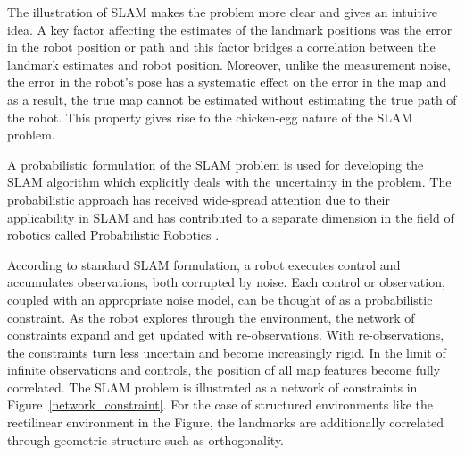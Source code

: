 The illustration of \acs{SLAM} makes the problem more clear and gives an intuitive idea. A key factor affecting the estimates of the landmark positions was the error in the robot position or path and this factor bridges a correlation between the landmark estimates and robot position. Moreover, unlike the measurement noise, the error in the robot's pose has a systematic effect on the error in the map and as a result, the true map cannot be estimated without estimating the true path of the robot. This property gives rise to the chicken-egg nature of the SLAM problem. 

A probabilistic formulation of the SLAM problem is used for developing the SLAM algorithm which explicitly deals with the uncertainty in the problem. The probabilistic approach has received wide-spread attention due to their applicability in SLAM and has contributed to a separate dimension in the field of robotics called Probabilistic Robotics \cite{thrun2005probabilistic}. 

According to standard SLAM formulation, a robot executes control and accumulates observations, both corrupted by noise. Each control or observation, coupled with an appropriate noise model, can be thought of as a probabilistic constraint. As the robot explores through the environment, the network of constraints expand and get updated with re-observations. With re-observations, the constraints turn less uncertain and become increasingly rigid. In the limit of infinite observations and controls, the position of all map features become fully correlated. The SLAM problem is illustrated as a network of constraints in Figure~\ref{network_constraint}. For the case of structured environments like the rectilinear environment in the Figure, the landmarks are additionally correlated through geometric structure such as orthogonality.

